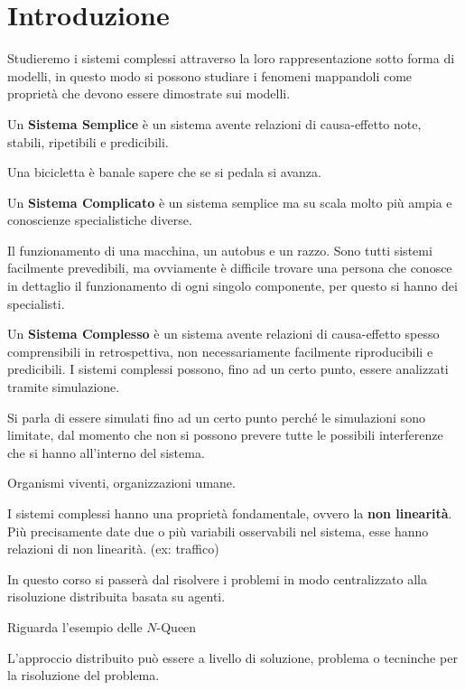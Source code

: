 \chapter{Introduzione}
Studieremo i sistemi complessi attraverso la loro rappresentazione sotto forma di
modelli, in questo modo si possono studiare i fenomeni mappandoli come proprietà
che devono essere dimostrate sui modelli.

\begin{definizione} 
    Un \textbf{Sistema Semplice} è un sistema avente relazioni di causa-effetto
    note, stabili, ripetibili e predicibili.
\end{definizione}
\begin{esempio}
    Una bicicletta è banale sapere che se si pedala si avanza.
\end{esempio}
\begin{definizione} 
    Un \textbf{Sistema Complicato} è un sistema semplice ma su scala molto più ampia
    e conoscienze specialistiche diverse.
\end{definizione}
\begin{esempio}
    Il funzionamento di una macchina, un autobus e un razzo. Sono tutti sistemi 
    facilmente prevedibili, ma ovviamente è difficile trovare una persona che conosce
    in dettaglio il funzionamento di ogni singolo componente, per questo si hanno
    dei specialisti. 
\end{esempio}
\begin{definizione} 
    Un \textbf{Sistema Complesso} è un sistema avente relazioni di causa-effetto
    spesso comprensibili in retrospettiva, non necessariamente facilmente
    riproducibili e predicibili. I sistemi complessi possono, fino ad un certo 
    punto, essere analizzati tramite simulazione.
\end{definizione}

Si parla di essere simulati fino ad un certo punto perché le simulazioni sono 
limitate, dal momento che non si possono prevere tutte le possibili interferenze che
si hanno all'interno del sistema.

\begin{esempio}
    Organismi viventi, organizzazioni umane.
\end{esempio}

I sistemi complessi hanno una proprietà fondamentale, ovvero la \textbf{non linearità}.
Più precisamente date due o più variabili osservabili nel sistema, esse hanno 
relazioni di non linearità. (ex: traffico)

In questo corso si passerà dal risolvere i problemi in modo centralizzato alla
risoluzione distribuita basata su agenti.
\begin{esempio}
    Riguarda l'esempio delle $N$-Queen
\end{esempio}

L'approccio distribuito può essere a livello di soluzione, problema o tecninche per
la risoluzione del problema.
